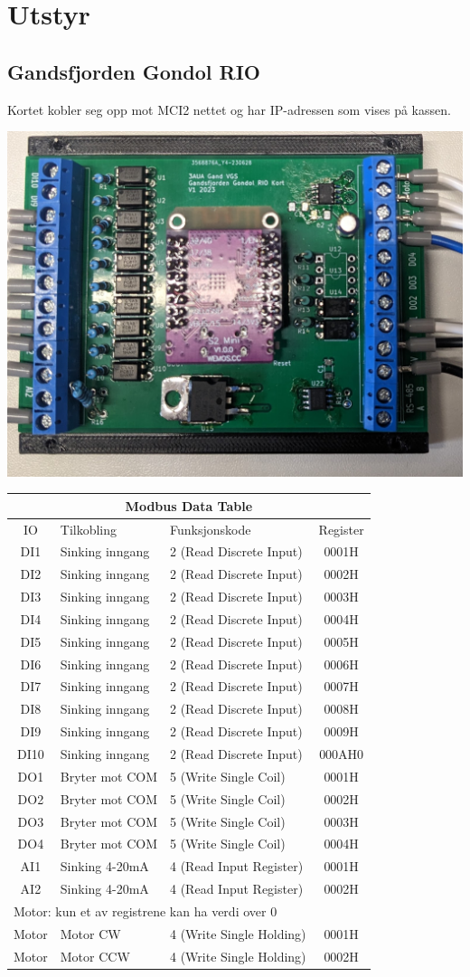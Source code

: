 
\section{Utstyr}
\subsection{Gandsfjorden Gondol RIO}

Kortet kobler seg opp mot MCI2 nettet og har IP-adressen som vises på kassen. 

\includegraphics[width=1\textwidth]{./GandsfjordenGondolRIO.jpg}
\small
\begin{tabular}{|c|l|l|c|}
\hline 
\multicolumn{4}{|c|}{Modbus Data Table}\tabularnewline
\hline 
\hline 
	IO & Tilkobling & Funksjonskode & Register \tabularnewline
\hline 
	DI1 & Sinking inngang & 2 (Read Discrete Input) & 0001H \tabularnewline
\hline 
	DI2 & Sinking inngang & 2 (Read Discrete Input) & 0002H \tabularnewline
\hline 
	DI3 & Sinking inngang & 2 (Read Discrete Input) & 0003H \tabularnewline
\hline 
	DI4 & Sinking inngang & 2 (Read Discrete Input) & 0004H \tabularnewline
\hline 
	DI5 & Sinking inngang & 2 (Read Discrete Input) & 0005H \tabularnewline
\hline 
	DI6 & Sinking inngang & 2 (Read Discrete Input) & 0006H \tabularnewline
\hline 
	DI7 & Sinking inngang & 2 (Read Discrete Input) & 0007H \tabularnewline
\hline 
	DI8 & Sinking inngang & 2 (Read Discrete Input) & 0008H \tabularnewline
\hline 
	DI9 & Sinking inngang & 2 (Read Discrete Input) & 0009H \tabularnewline
\hline 
	DI10 & Sinking inngang & 2 (Read Discrete Input) & 000AH0\tabularnewline
\hline 
	DO1 & Bryter mot COM & 5 (Write Single Coil) & 0001H \tabularnewline
\hline 
	DO2 & Bryter mot COM & 5 (Write Single Coil) & 0002H \tabularnewline
\hline 
	DO3 & Bryter mot COM & 5 (Write Single Coil) & 0003H \tabularnewline
\hline 
	DO4 & Bryter mot COM & 5 (Write Single Coil) & 0004H \tabularnewline
\hline 
	AI1 & Sinking 4-20mA & 4 (Read Input Register) & 0001H \tabularnewline
\hline 
	AI2 & Sinking 4-20mA & 4 (Read Input Register) & 0002H \tabularnewline
\hline 
\multicolumn{4}{|l|}{Motor: kun et av registrene kan ha verdi over 0}\tabularnewline
\hline 
	Motor &  Motor CW & 4 (Write Single Holding) & 0001H \tabularnewline
\hline 
	Motor &  Motor CCW & 4 (Write Single Holding) & 0002H \tabularnewline
\hline 
\end{tabular}
\normalsize
\vfil \eject
